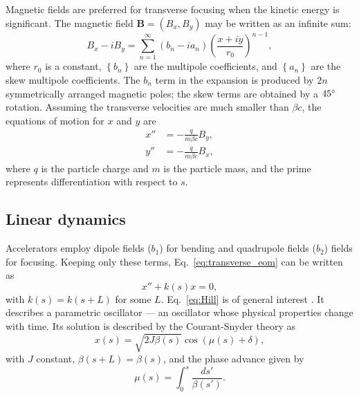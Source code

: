 Magnetic fields are preferred for transverse focusing when the kinetic energy is significant. The magnetic field $\mathbf{B} = (B_x, B_y)$ may be written as an infinite sum:
%
\begin{equation}\label{eq:magnetic_field_expansion}
    B_x - iB_y = \sum_{n = 1}^{\infty}{(b_n - i a_n) \left({\frac{x + i y}{r_0}}\right)^{n - 1}},
\end{equation}
%
where $r_0$ is a constant, $\left\{ b_n \right\}$ are the multipole coefficients, and $\left\{ a_n \right\}$ are the skew multipole coefficients. The $b_n$ term in the expansion is produced by $2n$ symmetrically arranged magnetic poles; the skew terms are obtained by a $45\degree$ rotation. Assuming the transverse velocities are much smaller than $\beta c$, the equations of motion for $x$ and $y$ are
%
\begin{equation}\label{eq:transverse_eom}
\begin{aligned}
    x'' &= -\frac{q}{m \beta c} B_y, \\
    y'' &= -\frac{q}{m \beta c} B_x,
\end{aligned}
\end{equation}
%
where $q$ is the particle charge and $m$ is the particle mass, and the prime represents differentiation with respect to $s$.


\subsection{Linear dynamics}

 Accelerators employ dipole fields ($b_1$) for bending and quadrupole fields ($b_2$) fields for focusing. Keeping only these terms, Eq.~\eqref{eq:transverse_eom} can be written as
%
 \begin{equation}\label{eq:Hill}
     x'' + k(s)x = 0,
 \end{equation}
%
with $k(s) = k(s + L)$ for some $L$. Eq.~\eqref{eq:Hill} is of general interest \cite{Qin2007}. It describes a parametric oscillator — an oscillator whose physical properties change with time. Its solution is described by the Courant-Snyder theory \cite{Courant1958} as
%
\begin{equation}\label{eq:Hill_solution}
    x(s) = \sqrt{2 J \beta(s)} \cos{\left({\mu(s) + \delta}\right)},
\end{equation}
%
with $J$ constant, $\beta(s + L) = \beta(s)$, and the phase advance given by
%
\begin{equation}
    \mu(s) = \int_{0}^{s}{\frac{ds'}{\beta(s')}}.
\end{equation}

